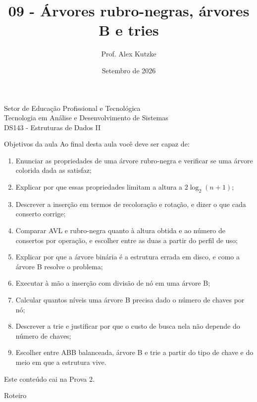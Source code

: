 \documentclass{beamer}
\title{09 - Árvores rubro-negras, árvores B e tries}
\author{Prof. Alex Kutzke}
\date{Setembro de 2026}
\begin{document}
\begin{frame}
	\begin{center}
		\large{Setor de Educação Profissional e Tecnológica}\\
		Tecnologia em Análise e Desenvolvimento de Sistemas\\
		\vspace{1cm}
		\small{DS143 - Estruturas de Dados II}
	\end{center}
	\titlepage
\end{frame}

\begin{frame}{Objetivos da aula}
	\footnotesize
	Ao final desta aula você deve ser capaz de:
	\begin{enumerate}
		\itemsep=0pt
		\item Enunciar as propriedades de uma árvore rubro-negra e verificar se uma
		      árvore colorida dada as satisfaz;
		\item Explicar por que essas propriedades limitam a altura a
		      $2\log_2(n+1)$;
		\item Descrever a inserção em termos de recoloração e rotação, e dizer o
		      que cada conserto corrige;
		\item Comparar AVL e rubro-negra quanto à altura obtida e ao número de
		      consertos por operação, e escolher entre as duas a partir do perfil
		      de uso;
		\item Explicar por que a árvore binária é a estrutura errada em disco, e
		      como a árvore B resolve o problema;
		\item Executar à mão a inserção com divisão de nó em uma árvore B;
		\item Calcular quantos níveis uma árvore B precisa dado o número de chaves
		      por nó;
		\item Descrever a trie e justificar por que o custo de busca nela não
		      depende do número de chaves;
		\item Escolher entre ABB balanceada, árvore B e trie a partir do tipo de
		      chave e do meio em que a estrutura vive.
	\end{enumerate}

	\vspace{0.1cm}
	Este conteúdo cai na Prova 2.
\end{frame}

\begin{frame}{Roteiro}
	\tableofcontents
\end{frame}
\end{document}
